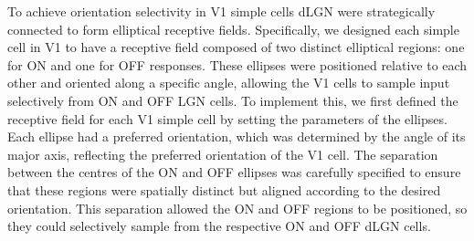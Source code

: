 \documentclass[12pt]{article}
\begin{document}
\bigbreak
To achieve orientation selectivity in V1 simple cells dLGN were strategically connected to form elliptical receptive fields. Specifically, we designed each simple cell in V1 to have a receptive field composed of two distinct elliptical regions: one for ON and one for OFF responses. These ellipses were positioned relative to each other and oriented along a specific angle, allowing the V1 cells to sample input selectively from ON and OFF LGN cells. To implement this, we first defined the receptive field for each V1 simple cell by setting the parameters of the ellipses. Each ellipse had a preferred orientation, which was determined by the angle of its major axis, reflecting the preferred orientation of the V1 cell. The separation between the centres of the ON and OFF ellipses was carefully specified to ensure that these regions were spatially distinct but aligned according to the desired orientation. This separation allowed the ON and OFF regions to be positioned, so they could selectively sample from the respective ON and OFF dLGN cells.
\end{document}
